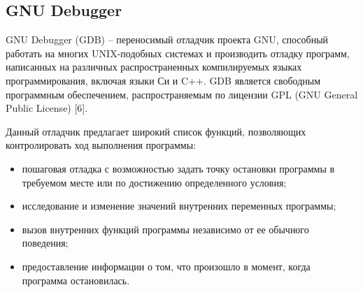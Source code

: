 \subsection{GNU Debugger}
GNU Debugger (GDB) -- переносимый отладчик проекта GNU, способный работать на многих UNIX-подобных системах и производить отладку программ, написанных на различных распространенных компилируемых языках программирования, включая языки Си и C++. GDB является свободным программным обеспечением, распространяемым по лицензии GPL (GNU General Public License) [6].\par
Данный отладчик предлагает широкий список функций, позволяющих контролировать ход выполнения программы:
\begin{itemize}
\item пошаговая отладка с возможностью задать точку остановки программы в требуемом месте или по достижению определенного условия;
\item исследование и изменение значений внутренних переменных программы;
\item вызов внутренних функций программы независимо от ее обычного поведения;
\item предоставление информации о том, что произошло в момент, когда программа остановилась.
\end{itemize}
\clearpage
